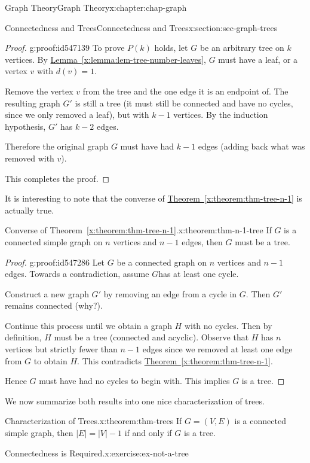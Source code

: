 \documentclass[oneside,10pt,]{book}
\newcommand{\xreffont}{\relax}
\numberwithin{equation}{section}
\begin{document}
\begin{chapterptx}{Graph Theory}{}{Graph Theory}{}{}{x:chapter:chap-graph}
\begin{sectionptx}{Connectedness and Trees}{}{Connectedness and Trees}{}{}{x:section:sec-graph-trees}
\begin{proof}{}{g:proof:id547139}
To prove \(P(k)\) holds, let \(G\) be an arbitrary tree on \(k\) vertices. By \hyperref[x:lemma:lem-tree-number-leaves]{Lemma~{\xreffont\ref{x:lemma:lem-tree-number-leaves}}}, \(G\) must have a leaf, or a vertex \(v\) with \(d(v) = 1\).%
\par
Remove the vertex \(v\) from the tree and the one edge it is an endpoint of. The resulting graph \(G'\) is still a tree (it must still be connected and have no cycles, since we only removed a leaf), but with \(k-1\) vertices. By the induction hypothesis, \(G'\) has \(k-2\) edges.%
\par
Therefore the original graph \(G\) must have had \(k-1\) edges (adding back what was removed with \(v\)).%
\par
This completes the proof.%
\end{proof}
It is interesting to note that the converse of \hyperref[x:theorem:thm-tree-n-1]{Theorem~{\xreffont\ref{x:theorem:thm-tree-n-1}}} is actually true.%
\begin{theorem}{Converse of Theorem~{\xreffont\ref*{x:theorem:thm-tree-n-1}}.}{}{x:theorem:thm-n-1-tree}%
If \(G\) is a connected simple graph on \(n\) vertices and \(n-1\) edges, then \(G\) must be a tree.%
\end{theorem}
\begin{proof}{}{g:proof:id547286}
Let \(G\) be a connected graph on \(n\) vertices and \(n-1\) edges. Towards a contradiction, assume \(G\)has at least one cycle.%
\par
Construct a new graph \(G'\) by removing an edge from a cycle in \(G\). Then \(G'\) remains connected (why?).%
\par
Continue this process until we obtain a graph \(H\) with no cycles. Then by definition, \(H\) must be a tree (connected and acyclic). Observe that \(H\) has \(n\) vertices but strictly fewer than \(n-1\) edges since we removed at least one edge from \(G\) to obtain \(H\). This contradicts \hyperref[x:theorem:thm-tree-n-1]{Theorem~{\xreffont\ref{x:theorem:thm-tree-n-1}}}.%
\par
Hence \(G\) must have had no cycles to begin with. This implies \(G\) is a tree.%
\end{proof}
We now summarize both results into one nice characterization of trees.%
\begin{theorem}{Characterization of Trees.}{}{x:theorem:thm-trees}%
If \(G = (V,E)\) is a connected simple graph, then \(|E| = |V| - 1\) if and only if \(G\) is a tree.%
\end{theorem}
\begin{inlineexercise}{Connectedness is Required.}{x:exercise:ex-not-a-tree}%

\end{inlineexercise}
\end{sectionptx}
\end{chapterptx}
\end{document}
